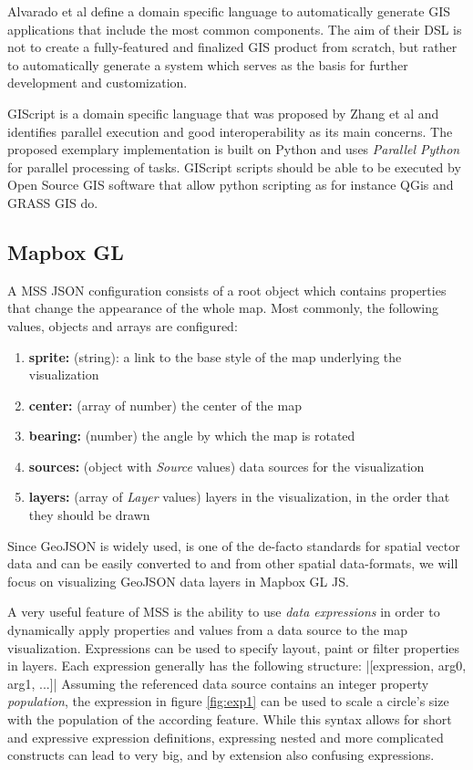 \documentclass[conference]{IEEEtran}
\begin{document}
Alvarado et al \cite{alvarado2019dsl} define a domain specific language to automatically generate GIS applications that include the most common components. The aim of their DSL is not to create a fully-featured and finalized GIS product from scratch, but rather to automatically generate a  system which serves as the basis for further development and customization.

GIScript is a domain specific language that was proposed by Zhang et al \cite{zhang2014gis} and identifies parallel execution and good interoperability as its main concerns. The proposed exemplary implementation is built on Python and uses \textit{Parallel Python} for parallel processing of tasks. GIScript scripts should be able to be executed by Open Source GIS software that allow python scripting as for instance QGis and GRASS GIS do.

\subsection{Mapbox GL}

A MSS JSON configuration consists of a root object which contains properties that change the appearance of the whole map. Most commonly, the following values, objects and arrays are configured: 

\begin{enumerate}
    \item \textbf{sprite:} (string): a link to the base style of the map underlying the visualization
    \item \textbf{center:} (array of number) the center of the map
    \item \textbf{bearing:} (number) the angle by which the map is rotated
    \item \textbf{sources:} (object with \textit{Source} values) data sources for the visualization
    \item \textbf{layers:} (array of \textit{Layer} values) layers in the visualization, in the order that they should be drawn
\end{enumerate}

Since GeoJSON is widely used, is one of the de-facto standards for spatial vector data and can be easily converted to and from other spatial data-formats\cite{dixson2020geojson}, we will focus on visualizing GeoJSON data layers in Mapbox GL JS.

A very useful feature of MSS is the ability to use \textit{data expressions} in order to dynamically apply properties and values from a data source to the map visualization. Expressions can be used to specify layout, paint or filter properties in layers. Each expression generally has the following structure: 
|[expression, arg0, arg1, ...]|
Assuming the referenced data source contains an integer property \textit{population}, the expression in figure \ref{fig:exp1} can be used to scale a circle's size with the population of the according feature. While this syntax allows for short and expressive expression definitions, expressing nested and more complicated constructs can lead to very big, and by extension also confusing expressions.
\end{document}
